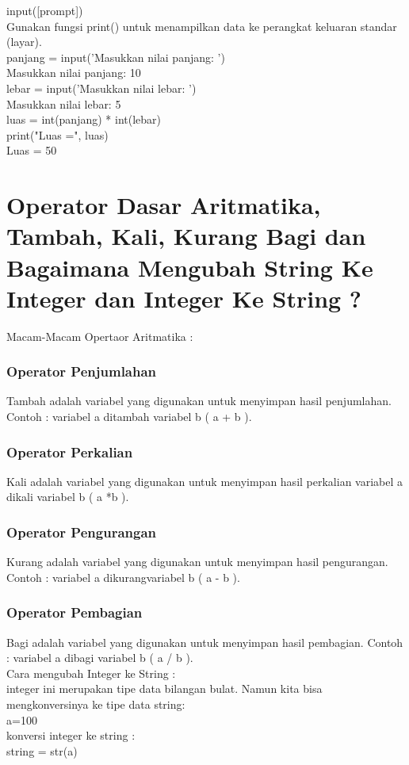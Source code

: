 input([prompt])\\

Gunakan fungsi print() untuk menampilkan data ke perangkat keluaran standar (layar).\\

 panjang = input('Masukkan nilai panjang: ')\\
Masukkan nilai panjang: 10\\
 lebar = input('Masukkan nilai lebar: ')\\
Masukkan nilai lebar: 5\\
 luas = int(panjang) * int(lebar)\\
 print("Luas =", luas)\\
Luas = 50\\
\section{Operator Dasar Aritmatika, Tambah, Kali, Kurang Bagi dan Bagaimana Mengubah String Ke Integer dan Integer Ke String ?}
Macam-Macam Opertaor Aritmatika :
\subsubsection{Operator Penjumlahan}
Tambah adalah variabel yang digunakan untuk menyimpan hasil penjumlahan. Contoh : variabel a ditambah variabel b ( a + b ).
\subsubsection{Operator Perkalian}
Kali adalah variabel yang digunakan untuk menyimpan hasil perkalian variabel a dikali variabel b ( a *b ).
\subsubsection{Operator Pengurangan}
Kurang adalah variabel yang digunakan untuk menyimpan hasil pengurangan. Contoh : variabel a dikurangvariabel b ( a - b ).
\subsubsection{Operator Pembagian}
Bagi adalah variabel yang digunakan untuk menyimpan hasil pembagian. Contoh : variabel a dibagi variabel b ( a / b ). \\

Cara mengubah Integer ke String :\\
integer ini merupakan tipe data bilangan bulat. Namun kita bisa mengkonversinya ke tipe data string:\\
a=100\\
konversi integer ke string : \\
string = str(a) \\

